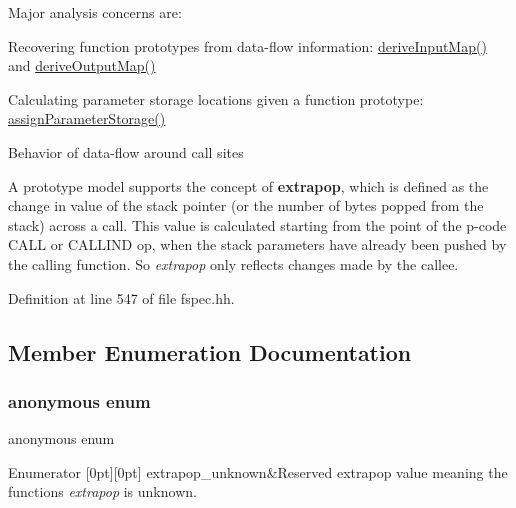 Major analysis concerns are\+:
\begin{DoxyItemize}
\item Recovering function prototypes from data-\/flow information\+: \mbox{\hyperlink{class_proto_model_a7f6da17343cb12b0e798fe7211441c58}{derive\+Input\+Map()}} and \mbox{\hyperlink{class_proto_model_a463595607985ec774f3df35dfbd7ca94}{derive\+Output\+Map()}}
\item Calculating parameter storage locations given a function prototype\+: \mbox{\hyperlink{class_proto_model_a5c32e533f079fc91875ccd486f70f36e}{assign\+Parameter\+Storage()}}
\item Behavior of data-\/flow around call sites
\end{DoxyItemize}

A prototype model supports the concept of {\bfseries{extrapop}}, which is defined as the change in value of the stack pointer (or the number of bytes popped from the stack) across a call. This value is calculated starting from the point of the p-\/code C\+A\+LL or C\+A\+L\+L\+I\+ND op, when the stack parameters have already been pushed by the calling function. So {\itshape extrapop} only reflects changes made by the callee. 

Definition at line 547 of file fspec.\+hh.



\subsection{Member Enumeration Documentation}
\mbox{\label{class_proto_model_ab532221dd4a9946b2dea90be44c79879}} 
\subsubsection{\texorpdfstring{anonymous enum}{anonymous enum}}
{\footnotesize\ttfamily anonymous enum}

\begin{DoxyEnumFields}{Enumerator}
[0pt][0pt]{}\mbox{\label{class_proto_model_ab532221dd4a9946b2dea90be44c79879ab0874d825448e7c731717fad59bbec92}} 
extrapop\+\_\+unknown&Reserved extrapop value meaning the function\textquotesingle{}s {\itshape extrapop} is unknown. \\
\hline

\end{DoxyEnumFields}


